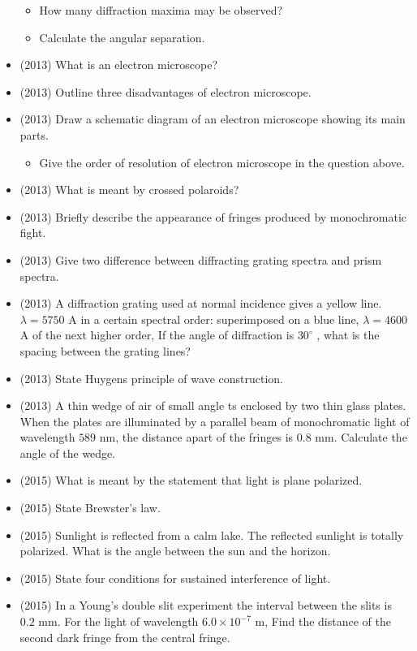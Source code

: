 \documentclass{article}
\begin{document}
\begin{itemize}
 \begin{itemize}
\item How many diffraction maxima may be observed?
\item Calculate the angular separation.
\end{itemize}
\item (2013)  What is an electron microscope? 
\item (2013)  Outline three disadvantages of electron microscope.
\item (2013)  Draw a schematic diagram of an electron microscope showing its main parts.
 \begin{itemize}
\item Give the order of resolution of electron microscope in the question above.
\end{itemize}
\item (2013)  What is meant by crossed polaroids? 
\item (2013)  Briefly describe the appearance of fringes produced by monochromatic fight.
\item (2013)  Give two difference between diffracting grating spectra and prism spectra.
\item (2013)  A diffraction grating used at normal incidence gives a yellow line. $ \lambda =5750$ A in a certain spectral order: superimposed on a blue line, $ \lambda =4600$ A of the next higher order, If the angle of diffraction is $ 30^{\circ}$ , what is the spacing between the grating lines? 
\item (2013)  State Huygens principle of wave construction. 
\item (2013)  A thin wedge of air of small angle ts enclosed by two thin glass plates. When the plates are illuminated by a parallel beam of monochromatic light of wavelength $ 589$ nm, the distance apart of the fringes is $ 0.8$ mm. Calculate the angle of the wedge. 
\item (2015)  What is meant by the statement that light is plane polarized.
\item (2015)  State Brewster’s law.
\item (2015)  Sunlight is reflected from a calm lake.  The reflected sunlight is totally polarized.  What is the angle between the sun and the horizon.
\item (2015)  State four conditions for sustained interference of light.
\item (2015)  In a Young’s double slit experiment the interval between the slits is $ 0.2$ mm.  For the light of wavelength $ 6.0\times 10^{-7}$ m, Find the distance of the second dark fringe from the central fringe.

\end{itemize}
\end{document}
